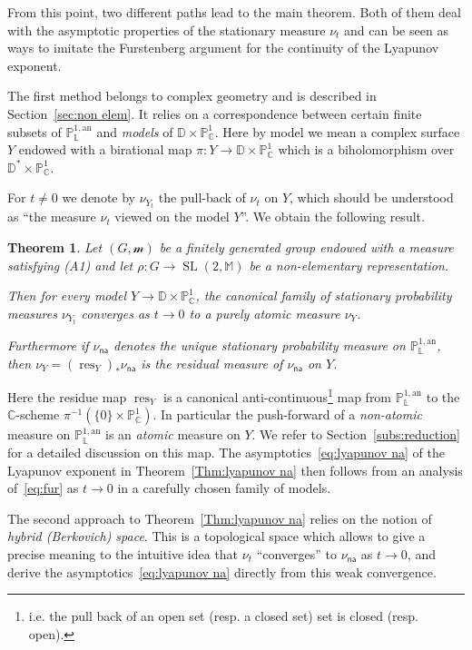 \documentclass[AHL,Unicode,longabstracts]{cedram}
\DeclareMathOperator{\SL}{SL}
\DeclareMathOperator{\res}{res}
\newcommand{\cc}{\mathbb{C}}
\newcommand{\dD}{\mathbb{D}}
\newcommand{\sm}{\mathcal{m}}
\newcommand{\mm}{\mathbb{M}}
\newcommand{\D}{\mathbb{D}}
\newcommand{\an}{\mathrm{an}}
\newcommand{\cv}{\rightarrow}
\newcommand{\PP}{\mathbb{P}}
\newcommand{\Laurent}{\mathbb{L}}
\newcommand{\na}{\mathsf{na}}
\newtheorem{mthm}{Theorem}
\begin{document}

From this point, two different paths lead to the main theorem. Both of them deal with the asymptotic properties of the stationary measure $\nu_t$ and can be seen as ways to imitate the Furstenberg argument for the continuity of the Lyapunov exponent.


The first method belongs to complex geometry and is described in Section~\ref{sec:non elem}. It relies on a correspondence between certain finite subsets of $\PP^{1,\an}_{\Laurent}$ and \emph{models} of $\D \times \PP^1_\cc $. Here by model we mean a complex surface $Y$ endowed with a birational map $\pi: Y \to \D \times \PP^1_\cc$ which is a biholomorphism over $\D^*\times \PP^1_\cc$.

For $t\neq 0$ we denote by $\nu_{Y_t}$ the pull-back of $\nu_t$ on $Y$, which should be understood as ``the measure $\nu_t$ viewed on the model $Y$''. We obtain the following result.

\begin{mthm}\label{Thm:atomic}
Let $(G, \sm)$ be a finitely generated group endowed with a measure satisfying (A1) and let $\rho: G\to \SL(2, \mm)$ be a non-elementary representation.

Then for every model $Y\cv \dD\times \PP^1_\cc$, the canonical family of stationary probability measures $\nu_{Y_t}$ converges as $t\to 0$ to a purely atomic measure $\nu_{Y}$.

Furthermore if $\nu_\na$ denotes the unique stationary probability measure on $\PP^{1,\an}_{\Laurent}$, then $\nu_Y = (\res_Y)_*\nu_\na$ is the residual measure of $\nu_\na$ on $Y$.
\end{mthm}

Here the residue map $\res_Y$ is a canonical anti-continuous\footnote{i.e. the pull back of an open set (resp. a closed set) set is closed (resp. open).} map from $\PP^{1,\an}_{\Laurent}$ to the $\cc$-scheme $\pi^{-1}(\{ 0 \} \times \PP^1_\cc)$. In particular the push-forward of a \emph{non-atomic} measure on $\PP^{1,\an}_{\Laurent}$ is an \emph{atomic} measure on $Y$. We refer to Section~\ref{subs:reduction} for a detailed discussion on this map. The asymptotics~\eqref{eq:lyapunov na} of the Lyapunov exponent in Theorem~\ref{Thm:lyapunov na} then follows from an analysis of~\eqref{eq:fur} as $t\cv 0$ in a carefully chosen family of models.


The second approach to Theorem~\ref{Thm:lyapunov na} relies on the notion of \emph{hybrid (Berkovich) space}. This is a topological space which allows to give a precise meaning to the intuitive idea that $\nu_t$ ``converges'' to $\nu_\na$ as $t\to 0$, and derive the asymptotics~\eqref{eq:lyapunov na} directly from this weak convergence.
\end{document}
